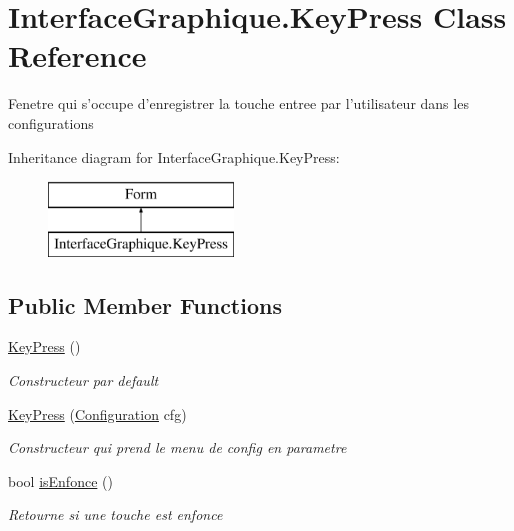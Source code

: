 \hypertarget{class_interface_graphique_1_1_key_press}{\section{Interface\-Graphique.\-Key\-Press Class Reference}
\label{class_interface_graphique_1_1_key_press}
}


Fenetre qui s'occupe d'enregistrer la touche entree par l'utilisateur dans les configurations  


Inheritance diagram for Interface\-Graphique.\-Key\-Press\-:\begin{figure}[H]
\begin{center}
\leavevmode
\includegraphics[height=2.000000cm]{class_interface_graphique_1_1_key_press}
\end{center}
\end{figure}
\subsection*{Public Member Functions}
\begin{DoxyCompactItemize}
\item 
\hyperlink{class_interface_graphique_1_1_key_press_ace2229d11f20b25086c1847b1e4f66aa}{Key\-Press} ()
\begin{DoxyCompactList}\small\item\em Constructeur par default \end{DoxyCompactList}\item 
\hyperlink{class_interface_graphique_1_1_key_press_af82c22bc2ae0e214364d0a440c02863c}{Key\-Press} (\hyperlink{class_interface_graphique_1_1_configuration}{Configuration} cfg)
\begin{DoxyCompactList}\small\item\em Constructeur qui prend le menu de config en parametre \end{DoxyCompactList}\item 
bool \hyperlink{class_interface_graphique_1_1_key_press_adab69f57d4bbd146942d0244b8388eee}{is\-Enfonce} ()
\begin{DoxyCompactList}\small\item\em Retourne si une touche est enfonce \end{DoxyCompactList}\end{DoxyCompactItemize}


